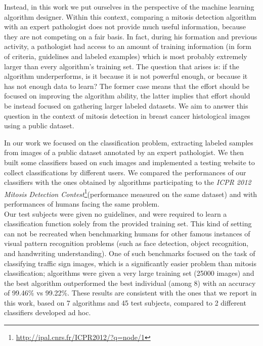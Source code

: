 Instead, in this work we put ourselves in the perspective of the machine learning algorithm designer. Within this context, comparing a
mitosis detection algorithm with an expert pathologist does not provide
much useful information, because they are not competing on a fair basis. In fact, during
his formation and previous activity, a pathologist had access to an amount of training information (in form of criteria, guidelines and labeled examples) which is
most probably extremely larger than every algorithm's training set. The question that arises is: if the algorithm
underperforms, is it because it is not powerful enough, or because it has not enough data to learn?
The former case means that the effort should be focused on improving the algorithm ability, the latter implies that effort should be instead focused on gathering larger labeled datasets.
We aim to answer this question in the context of mitosis detection in breast
cancer histological images using a public dataset.

\vspace{0.6cm}

In our work we focused on the classification problem, extracting labeled samples from images of a public dataset annotated by an expert pathologist.
We then built some classifiers based on such images and implemented a testing website to collect classifications by different users.
We compared the performances of our classifiers with the ones obtained by algorithms participating to the 
\textit{ICPR 2012 Mitosis Detection Contest}\footnote{\url{http://ipal.cnrs.fr/ICPR2012/?q=node/1}}(performance measured on the same dataset) and with performances of humans facing the same problem.\\
Our test subjects were given no guidelines, and were required to
learn a classification function solely from the provided training set.
This kind of setting can not be recreated when benchmarking humans for other famous instances of visual pattern recognition problems (such as
face detection, object recognition, and handwriting understanding). One of such
benchmarks \cite{ML_traffic} focused on the task of classifying traffic sign images, which is a
significantly easier problem than mitosis classification; algorithms were given a
very large training set (25000 images) and the best algorithm outperformed the best
individual (among 8) with an accuracy of 99.46\% vs 99.22\%.
These results are consistent with the ones that we report in this work, based on 7 algorithms and 45 test subjects, compared to 2 different classifiers developed ad hoc.




